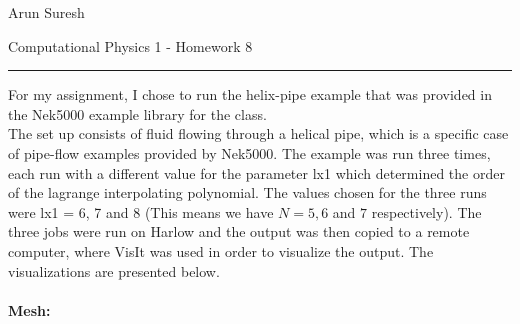 \documentclass[12pt]{article}
\begin{document}
	Arun Suresh
	\begin{center}
		Computational Physics 1 - Homework 8
	\end{center} 
	{\rule{\linewidth}{0.1mm} }

For my assignment, I chose to run the helix-pipe example that was provided in the Nek5000 example library for the class. \\
\indent The set up consists of fluid flowing through a helical pipe, which is a specific case of pipe-flow examples provided by Nek5000. The example was run three times, each run with a different value for the parameter lx1 which determined the order of the lagrange interpolating polynomial. The values chosen for the three runs were lx1 = 6, 7 and 8 (This means we have $N=5, 6$ and $7$ respectively). The three jobs were run on Harlow and the output was then copied to a remote computer, where VisIt was used in order to visualize the output. The visualizations are presented below. 
\\\\
\textbf{Mesh:}
\end{document}
